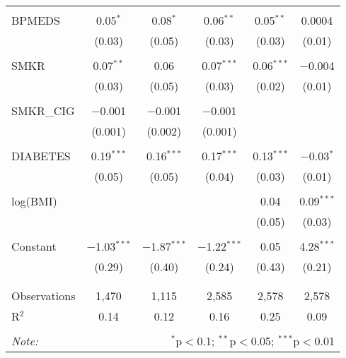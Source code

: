 \begin{table}[!htbp]
\begin{tabular}{@{\extracolsep{1pt}}lccccc}
  & & & & & \\ 
 BPMEDS & 0.05$^{*}$ & 0.08$^{*}$ & 0.06$^{**}$ & 0.05$^{**}$ & 0.0004 \\ 
  & (0.03) & (0.05) & (0.03) & (0.03) & (0.01) \\ 
  & & & & & \\ 
 SMKR & 0.07$^{**}$ & 0.06 & 0.07$^{***}$ & 0.06$^{***}$ & $-$0.004 \\ 
  & (0.03) & (0.05) & (0.03) & (0.02) & (0.01) \\ 
  & & & & & \\ 
 SMKR\_CIG & $-$0.001 & $-$0.001 & $-$0.001 &  &  \\ 
  & (0.001) & (0.002) & (0.001) &  &  \\ 
  & & & & & \\ 
 DIABETES & 0.19$^{***}$ & 0.16$^{***}$ & 0.17$^{***}$ & 0.13$^{***}$ & $-$0.03$^{*}$ \\ 
  & (0.05) & (0.05) & (0.04) & (0.03) & (0.01) \\ 
  & & & & & \\ 
 log(BMI) &  &  &  & 0.04 & 0.09$^{***}$ \\ 
  &  &  &  & (0.05) & (0.03) \\ 
  & & & & & \\ 
 Constant & $-$1.03$^{***}$ & $-$1.87$^{***}$ & $-$1.22$^{***}$ & 0.05 & 4.28$^{***}$ \\ 
  & (0.29) & (0.40) & (0.24) & (0.43) & (0.21) \\ 
  & & & & & \\ 
\hline \\[-1.8ex] 
Observations & 1,470 & 1,115 & 2,585 & 2,578 & 2,578 \\ 
R$^{2}$ & 0.14 & 0.12 & 0.16 & 0.25 & 0.09 \\ 
\hline 
\hline \\[-1.8ex] 
\textit{Note:}  & \multicolumn{5}{r}{$^{*}$p$<$0.1; $^{**}$p$<$0.05; $^{***}$p$<$0.01} \\ 
\end{tabular} 
\end{table} 
